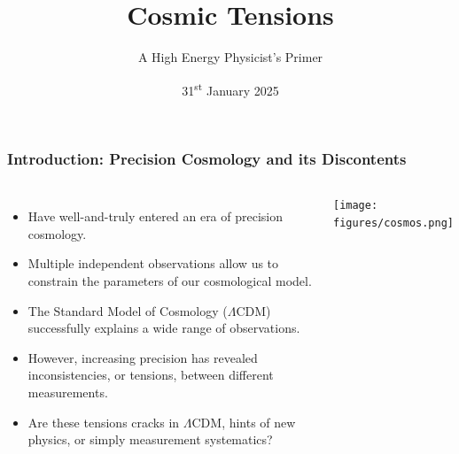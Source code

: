 \documentclass[aspectratio=169]{beamer}
\title{Cosmic Tensions}
\subtitle{A High Energy Physicist's Primer}
\date{31\textsuperscript{st} January 2025}
\begin{document}
\begin{frame}
    \titlepage
\end{frame}

\begin{frame}
    \frametitle{Introduction: Precision Cosmology and its Discontents}
    \vspace{-0.1cm}
    \begin{columns}
        \begin{itemize}
            \item Have well-and-truly entered an era of precision cosmology.
            \item Multiple independent observations allow us to constrain the parameters of our cosmological model.
            \item The Standard Model of Cosmology ($\Lambda$CDM) successfully explains a wide range of observations.
            \item However, increasing precision has revealed inconsistencies, or tensions, between different measurements.
            \item Are these tensions cracks in $\Lambda$CDM, hints of new physics, or simply measurement systematics?
        \end{itemize}
        \texttt{[image: figures/cosmos.png]}
    \end{columns}
\end{frame}
\end{document}
